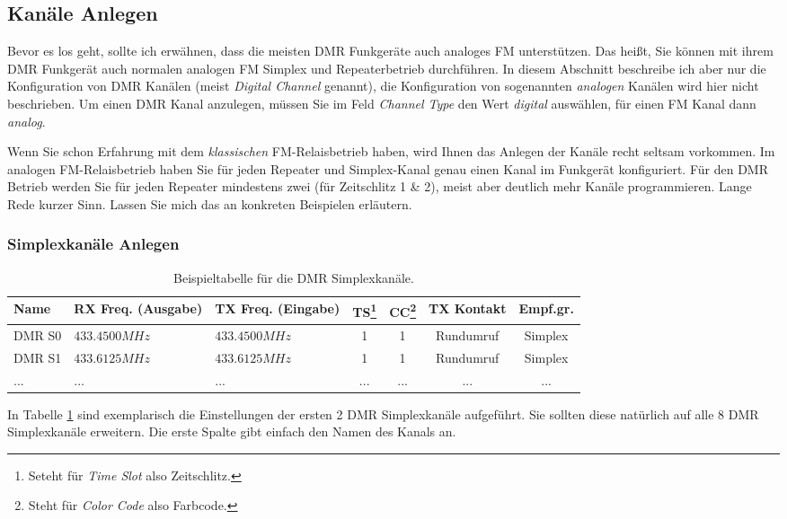 \subsection{Kanäle Anlegen} \label{sec:cp:channel}
Bevor es los geht, sollte ich erwähnen, dass die meisten DMR Funkgeräte auch analoges FM unterstützen. Das heißt, Sie können mit ihrem DMR Funkgerät auch normalen analogen FM Simplex und Repeaterbetrieb durchführen. In diesem Abschnitt beschreibe ich aber nur die Konfiguration von DMR Kanälen (meist \emph{Digital Channel} genannt), die Konfiguration von sogenannten \emph{analogen} Kanälen wird hier nicht beschrieben. Um einen DMR Kanal anzulegen, müssen Sie im Feld \emph{Channel Type} den Wert \emph{digital} auswählen, für einen FM Kanal dann \emph{analog}.

Wenn Sie schon Erfahrung mit dem \emph{klassischen} FM-Relaisbetrieb haben, wird Ihnen das Anlegen der Kanäle recht seltsam vorkommen. Im analogen FM-Relaisbetrieb haben Sie für jeden Repeater und Simplex-Kanal genau einen Kanal im Funkgerät konfiguriert. Für den DMR Betrieb werden Sie für jeden Repeater mindestens zwei (für Zeitschlitz 1 \& 2), meist aber deutlich mehr Kanäle programmieren. Lange Rede kurzer Sinn. Lassen Sie mich das an konkreten Beispielen erläutern.

\subsubsection{Simplexkanäle Anlegen}
\begin{table}[!ht]
 \begin{tabular}{|l|p{2.5cm}|p{2.5cm}|c|c|c|c|} \hline
 Name       & RX Freq. (Ausgabe) & TX Freq. (Eingabe) & TS\footnote{Seteht für \emph{Time Slot} also Zeitschlitz.} & CC\footnote{Steht für \emph{Color Code} also Farbcode.} & TX Kontakt & Empf.gr. \\ \hline
 DMR S0     & $433.4500 MHz$     & $433.4500 MHz$     & 1           & 1        & Rundumruf  & Simplex \\
 DMR S1     & $433.6125 MHz$     & $433.6125 MHz$     & 1           & 1        & Rundumruf  & Simplex \\
 ...        & ...                & ...                & ...         & ...      & ...        & ... \\ \hline
 \end{tabular}
 \caption{Beispieltabelle für die DMR Simplexkanäle.} \label{tab:ch:simplex}
\end{table}

In Tabelle \ref{tab:ch:simplex} sind exemplarisch die Einstellungen der ersten 2 DMR Simplexkanäle aufgeführt. Sie sollten diese natürlich auf alle 8 DMR Simplexkanäle erweitern. Die erste Spalte gibt einfach den Namen des Kanals an. 

